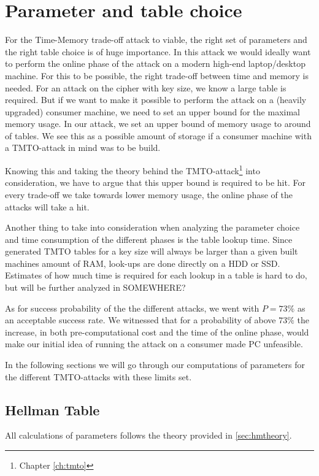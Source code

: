 \chapter{Parameter and table choice}
\label{ch:param}
For the Time-Memory trade-off attack to viable, the right set of
parameters and the right table choice is of huge importance. In this
attack we would ideally want to perform the online phase of the  attack on a modern
high-end laptop/desktop machine. For this to be possible, the right
trade-off between time and memory is needed. For an attack on the
cipher with  key size, we know a large table is required. But if
we want to make it possible to perform the attack on a (heavily
upgraded) consumer
machine, we need to set an upper bound for the maximal memory
usage. In our attack, we set an upper bound of memory usage to around
 of tables. We see this as a possible amount of storage if a
consumer machine with a TMTO-attack in mind was to be build. 

Knowing this and taking the theory behind the
TMTO-attack\footnote{Chapter \ref{ch:tmto}} into consideration, we
have to argue that this upper bound is required to be hit. For every
trade-off we take towards lower memory usage, the online phase of the
attacks will take a hit. 

Another thing to take into consideration when analyzing the parameter
choice and time consumption of the different phases is the table lookup
time. Since generated TMTO tables for a  key size will
always be larger than a given built machines amount of RAM, look-ups are
done directly on a HDD or SSD. Estimates of how much time is required
for each lookup in a table is hard to do, but will be further analyzed
in SOMEWHERE? 

As for success probability of the 
the different attacks, we went with $P = 73\%$ as an acceptable
success rate.
We witnessed that for a probability of above $73\%$ the increase,
in both pre-computational cost and the time of the online phase, would
make our initial idea of running the attack on a consumer made PC
unfeasible.

In the following sections we will go through our computations of
parameters for the different TMTO-attacks with these limits set.

\section{Hellman Table}

All calculations of parameters follows the theory provided in \ref{sec:hmtheory}.

